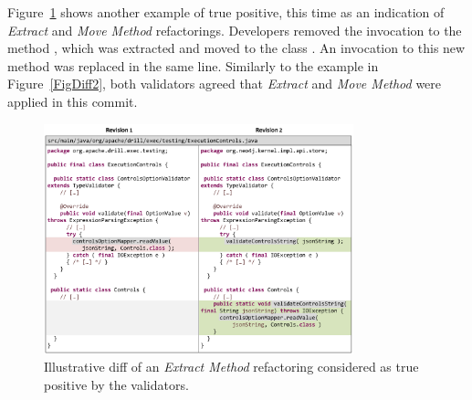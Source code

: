 Figure~\ref{FigDiff3} shows another example of true positive, this time as an indication of \emph{Extract} and \emph{Move Method} refactorings. Developers removed the invocation to the method , which was extracted and moved to the class . An invocation to this new method  was replaced in the same line. Similarly to the example in Figure~\ref{FigDiff2}, both validators agreed that \emph{Extract} and \emph{Move Method} were applied in this commit.

\begin{figure}[htb]
\centering
\includegraphics[width=0.8\textwidth]{img/diff3.pdf}
\caption{Illustrative diff of an \emph{Extract Method} refactoring considered as true positive by the validators.}
\label{FigDiff3}
\end{figure}


